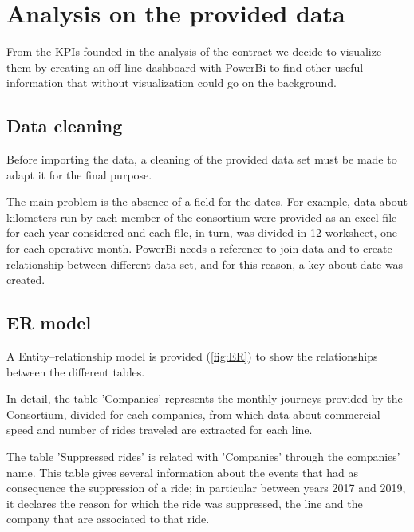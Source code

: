 \chapter{Analysis on the provided data}
From the KPIs founded in the analysis of the contract we decide to visualize them by creating an off-line dashboard with PowerBi to find other useful information that without visualization could go on the background.

\section{Data cleaning}
Before importing the data, a cleaning of the provided data set must be made to adapt it for the final purpose. 

The main problem is the absence of a field for the dates. For example, data about kilometers run by each member of the consortium were provided as an excel file for each year considered and each file, in turn, was divided in 12 worksheet, one for each operative month. PowerBi needs a reference to join data and to create relationship between different data set, and for this reason, a key about date was created.  

\section{ER model}
A Entity–relationship model is provided (\ref{fig:ER}) to show the relationships between the different tables.

In detail, the table 'Companies' represents the monthly journeys provided by the Consortium, divided for each companies, from which data about commercial speed and number of rides traveled are extracted for each line. 

The table 'Suppressed rides' is related with 'Companies' through the companies' name. This table gives several information about the events that had as consequence the suppression of a ride; in particular between years 2017 and 2019, it declares the reason for which the ride was suppressed, the line and the company that are associated to that ride. 

